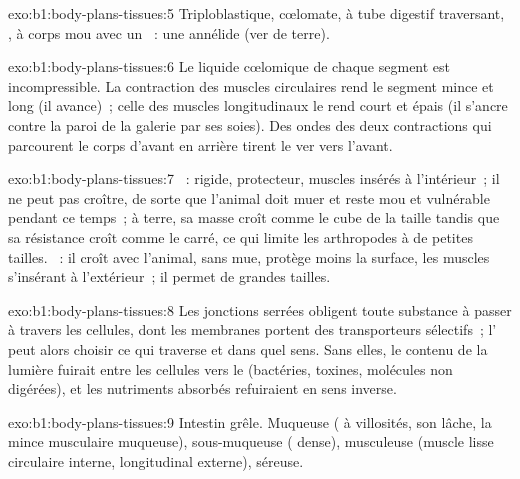 \begin{solution}{exo:b1:body-plans-tissues:5}
Triploblastique, cœlomate, à tube digestif traversant, , à
corps mou avec un ~: une annélide (ver de terre).
\end{solution}

\begin{solution}{exo:b1:body-plans-tissues:6}
Le liquide cœlomique de chaque segment est incompressible. La
contraction des muscles circulaires rend le segment mince et long (il
avance)~; celle des muscles longitudinaux le rend court et épais (il
s'ancre contre la paroi de la galerie par ses soies). Des ondes des deux
contractions qui parcourent le corps d'avant en arrière tirent le ver
vers l'avant.
\end{solution}

\begin{solution}{exo:b1:body-plans-tissues:7}
~: rigide, protecteur, muscles insérés à l'intérieur~; il ne
peut pas croître, de sorte que l'animal doit muer et reste mou et
vulnérable pendant ce temps~; à terre, sa masse croît comme le cube de
la taille tandis que sa résistance croît comme le carré, ce qui limite
les arthropodes à de petites tailles. ~: il croît avec
l'animal, sans mue, protège moins la surface, les muscles s'insérant à
l'extérieur~; il permet de grandes tailles.
\end{solution}

\begin{solution}{exo:b1:body-plans-tissues:8}
Les jonctions serrées obligent toute substance à passer à travers les
cellules, dont les membranes portent des transporteurs sélectifs~;
l' peut alors choisir ce qui traverse et dans quel sens. Sans
elles, le contenu de la lumière fuirait entre les cellules vers le
 (bactéries, toxines, molécules non digérées), et les
nutriments absorbés refuiraient en sens inverse.
\end{solution}

\begin{solution}{exo:b1:body-plans-tissues:9}
Intestin grêle. Muqueuse ( à villosités, son 
lâche, la mince musculaire muqueuse), sous-muqueuse (
dense), musculeuse (muscle lisse circulaire interne, longitudinal
externe), séreuse.
\end{solution}

